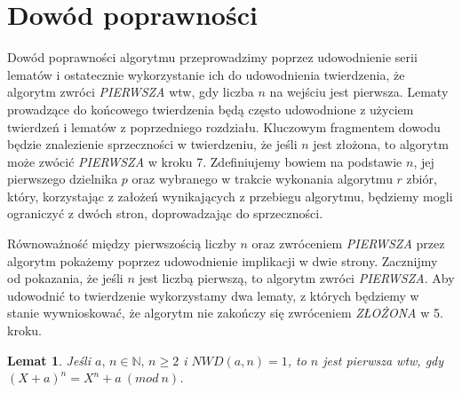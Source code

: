 \documentclass[polish,declaration,shortabstract]{iithesis}
\theoremstyle{definition}
\theoremstyle{remark} \newtheorem{observation}{Obserwacja}
\theoremstyle{plain} \newtheorem{theorem}{Twierdzenie}
\theoremstyle{plain} \newtheorem{lemma}{Lemat}
\theoremstyle{remark} \newtheorem*{remark*}{Uwaga}
\theoremstyle{reminder} \newtheorem*{reminder*}{Przypomnienie}
\begin{document}
\section{Dowód poprawności}
    
Dowód poprawności algorytmu przeprowadzimy poprzez udowodnienie serii lematów i ostatecznie wykorzystanie ich do udowodnienia twierdzenia, że algorytm zwróci \textit{PIERWSZA} wtw, gdy liczba $n$ na wejściu jest pierwsza. Lematy prowadzące do końcowego twierdzenia będą często udowodnione z użyciem twierdzeń i lematów z poprzedniego rozdziału. Kluczowym fragmentem dowodu będzie znalezienie sprzeczności w twierdzeniu, że jeśli $n$ jest złożona, to algorytm może zwócić \textit{PIERWSZA} w kroku 7. Zdefiniujemy bowiem na podstawie $n$, jej pierwszego dzielnika $p$ oraz wybranego w trakcie wykonania algorytmu $r$ zbiór, który, korzystając z założeń wynikających z przebiegu algorytmu, będziemy mogli ograniczyć z dwóch stron, doprowadzając do sprzeczności. 

Równoważność między pierwszością liczby $n$ oraz zwróceniem \textit{PIERWSZA} przez algorytm pokażemy poprzez udowodnienie implikacji w dwie strony. Zacznijmy od pokazania, że jeśli $n$ jest liczbą pierwszą, to algorytm zwróci \textit{PIERWSZA}. Aby udowodnić to twierdzenie wykorzystamy dwa lematy, z których będziemy w stanie wywnioskować, że algorytm nie zakończy się zwróceniem \textit{ZŁOŻONA} w 5. kroku.
\begin{lemma}\label{L1}
	Jeśli $a, \, n \in \mathbb{N}, \, n \geq 2$ i $NWD(a, n) = 1$, to $n$ jest pierwsza wtw, gdy $(X + a)^n = X^n + a \: (mod \: n)$.
\end{lemma}
	
\end{document}
